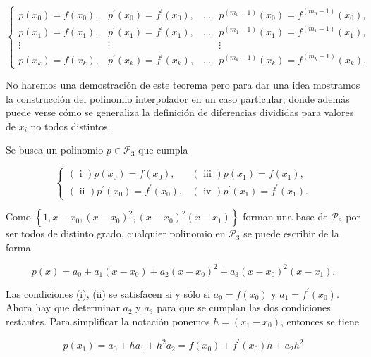 \documentclass[10pt]{book}
\begin{document}
$$
\left\{\begin{array}{cccc}
p\left(x_{0}\right)=f\left(x_{0}\right), & p^{\prime}\left(x_{0}\right)=f^{\prime}\left(x_{0}\right), & \ldots & p^{\left(m_{0}-1\right)}\left(x_{0}\right)=f^{\left(m_{0}-1\right)}\left(x_{0}\right), \\
p\left(x_{1}\right)=f\left(x_{1}\right), & p^{\prime}\left(x_{1}\right)=f^{\prime}\left(x_{1}\right), & \ldots & p^{\left(m_{1}-1\right)}\left(x_{1}\right)=f^{\left(m_{1}-1\right)}\left(x_{1}\right), \\
\vdots & \vdots & & \vdots \\
p\left(x_{k}\right)=f\left(x_{k}\right), & p^{\prime}\left(x_{k}\right)=f^{\prime}\left(x_{k}\right), & \ldots & p^{\left(m_{k}-1\right)}\left(x_{k}\right)=f^{\left(m_{k}-1\right)}\left(x_{k}\right) .
\end{array}\right.
$$

No haremos una demostración de este teorema pero para dar una idea mostramos la construcción del polinomio interpolador en un caso particular; donde además puede verse cómo se generaliza la definición de diferencias divididas para valores de $x_{i}$ no todos distintos.

Se busca un polinomio $p \in \mathcal{P}_{3}$ que cumpla

$$
\begin{cases}(\text { i }) p\left(x_{0}\right)=f\left(x_{0}\right), & (\text { iii }) p\left(x_{1}\right)=f\left(x_{1}\right), \\ (\text { ii }) p^{\prime}\left(x_{0}\right)=f^{\prime}\left(x_{0}\right), & (\text { iv }) p^{\prime}\left(x_{1}\right)=f^{\prime}\left(x_{1}\right) .\end{cases}
$$

Como $\left\{1, x-x_{0},\left(x-x_{0}\right)^{2},\left(x-x_{0}\right)^{2}\left(x-x_{1}\right)\right\}$ forman una base de $\mathcal{P}_{3}$ por ser todos de distinto grado, cualquier polinomio en $\mathcal{P}_{3}$ se puede escribir de la forma

$$
p(x)=a_{0}+a_{1}\left(x-x_{0}\right)+a_{2}\left(x-x_{0}\right)^{2}+a_{3}\left(x-x_{0}\right)^{2}\left(x-x_{1}\right) .
$$

Las condiciones (i), (ii) se satisfacen si y sólo si $a_{0}=f\left(x_{0}\right)$ y $a_{1}=f^{\prime}\left(x_{0}\right)$. Ahora hay que determinar $a_{2}$ y $a_{3}$ para que se cumplan las dos condiciones restantes. Para simplificar la notación ponemos $h=\left(x_{1}-x_{0}\right)$, entonces se tiene

$$
p\left(x_{1}\right)=a_{0}+h a_{1}+h^{2} a_{2}=f\left(x_{0}\right)+f^{\prime}\left(x_{0}\right) h+a_{2} h^{2}
$$
\end{document}
